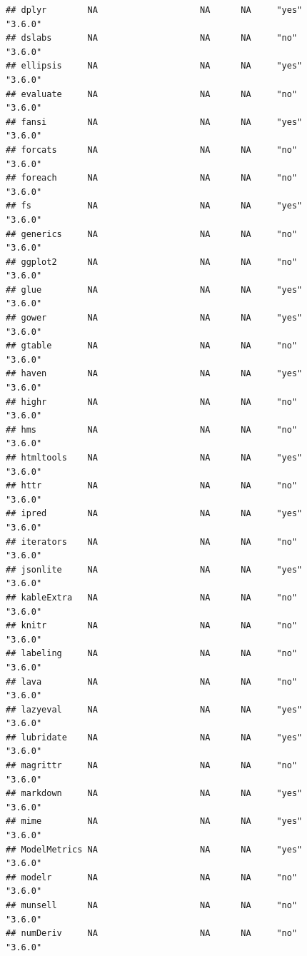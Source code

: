 \documentclass[]{article}
\begin{document}
\begin{verbatim}
## dplyr        NA                    NA      NA     "yes"            "3.6.0"
## dslabs       NA                    NA      NA     "no"             "3.6.0"
## ellipsis     NA                    NA      NA     "yes"            "3.6.0"
## evaluate     NA                    NA      NA     "no"             "3.6.0"
## fansi        NA                    NA      NA     "yes"            "3.6.0"
## forcats      NA                    NA      NA     "no"             "3.6.0"
## foreach      NA                    NA      NA     "no"             "3.6.0"
## fs           NA                    NA      NA     "yes"            "3.6.0"
## generics     NA                    NA      NA     "no"             "3.6.0"
## ggplot2      NA                    NA      NA     "no"             "3.6.0"
## glue         NA                    NA      NA     "yes"            "3.6.0"
## gower        NA                    NA      NA     "yes"            "3.6.0"
## gtable       NA                    NA      NA     "no"             "3.6.0"
## haven        NA                    NA      NA     "yes"            "3.6.0"
## highr        NA                    NA      NA     "no"             "3.6.0"
## hms          NA                    NA      NA     "no"             "3.6.0"
## htmltools    NA                    NA      NA     "yes"            "3.6.0"
## httr         NA                    NA      NA     "no"             "3.6.0"
## ipred        NA                    NA      NA     "yes"            "3.6.0"
## iterators    NA                    NA      NA     "no"             "3.6.0"
## jsonlite     NA                    NA      NA     "yes"            "3.6.0"
## kableExtra   NA                    NA      NA     "no"             "3.6.0"
## knitr        NA                    NA      NA     "no"             "3.6.0"
## labeling     NA                    NA      NA     "no"             "3.6.0"
## lava         NA                    NA      NA     "no"             "3.6.0"
## lazyeval     NA                    NA      NA     "yes"            "3.6.0"
## lubridate    NA                    NA      NA     "yes"            "3.6.0"
## magrittr     NA                    NA      NA     "no"             "3.6.0"
## markdown     NA                    NA      NA     "yes"            "3.6.0"
## mime         NA                    NA      NA     "yes"            "3.6.0"
## ModelMetrics NA                    NA      NA     "yes"            "3.6.0"
## modelr       NA                    NA      NA     "no"             "3.6.0"
## munsell      NA                    NA      NA     "no"             "3.6.0"
## numDeriv     NA                    NA      NA     "no"             "3.6.0"

\end{verbatim}
\end{document}
